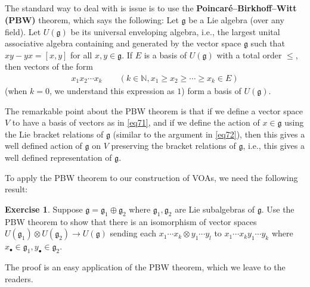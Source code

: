 \documentclass[11pt,b5paper,notitlepage]{article}
\theoremstyle{definition}
\newtheorem{exe}[df]{Exercise}
\theoremstyle{plain}
\newcommand{\fk}{\mathfrak}
\newcommand{\gk}{\mathfrak g}
\newcommand{\blt}{\bullet}
\newcommand{\Nbb}{\mathbb N}
\numberwithin{equation}{section}
\begin{document}
\subsection{}

The standard way to deal with is issue is to use the \textbf{Poincar\'e–Birkhoff–Witt (PBW)} theorem, which says the following: Let $\fk g$ be a Lie algebra (over any field). Let $U(\fk g)$ be its universal enveloping algebra, i.e., the largest unital associative algebra containing and generated by the vector space $\fk g$ such that $xy-yx=[x,y]$ for all $x,y\in\fk g$. If $E$ is a basis of $U(\gk)$ with a total order $\leq$, then vectors of the form
\begin{align}
x_1x_2\cdots x_k\qquad (k\in\Nbb,x_1\geq x_2\geq\cdots\geq x_k\in E)	\label{eq71}
\end{align}
(when $k=0$, we understand this expression as $1$) form a basis of $U(\fk g)$.

The remarkable point about the PBW theorem is that if we define a vector space $V$ to have a basis of vectors as in \eqref{eq71}, and if we define the action of $x\in\fk g$ using the Lie bracket relations of $\fk g$ (similar to the argument in \eqref{eq72}), then this gives a well defined action of $\fk g$ on $V$ preserving the bracket relations of $\fk g$, i.e., this gives a well defined representation of $\fk g$.

To apply the PBW theorem to our construction of VOAs, we need the following result:
\begin{exe}\label{lb46}
Suppose $\gk=\gk_1\oplus\gk_2$ where $\gk_1,\gk_2$ are Lie subalgebras of $\gk$. Use the PBW theorem to show that there is an isomorphism of vector spaces $U(\gk_1)\otimes U(\gk_2)\rightarrow U(\gk)$ sending each $x_1\cdots x_k\otimes y_1\cdots y_l$ to $x_1\cdots x_ky_1\cdots y_k$ where $x_\blt\in\gk_1,y_\blt\in\gk_2$. 
\end{exe}
The proof is an easy application of the PBW theorem, which we leave to the readers.
\end{document}

